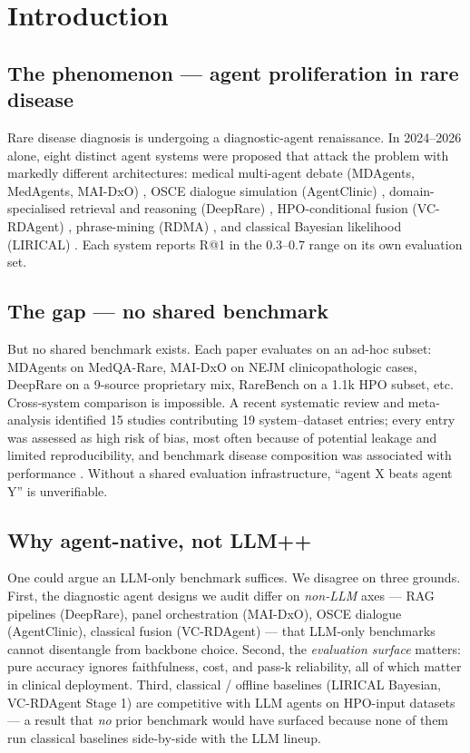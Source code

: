 \section{Introduction}\label{sec-2}

\subsection{The phenomenon --- agent proliferation in rare disease}\label{sec-2-1}

Rare disease diagnosis is undergoing a diagnostic-agent renaissance.
In 2024--2026 alone, eight distinct agent systems were proposed that
attack the problem with markedly different architectures: medical
multi-agent debate (MDAgents, MedAgents, MAI-DxO)
\citep{mdagents2024,medagents2024,maidxo2025}, OSCE dialogue simulation
(AgentClinic) \citep{agentclinic2024}, domain-specialised retrieval and
reasoning (DeepRare) \citep{deeprare2026}, HPO-conditional fusion
(VC-RDAgent) \citep{vcrdagent}, phrase-mining (RDMA) \citep{rdma2025},
and classical Bayesian likelihood (LIRICAL) \citep{lirical2020}.
Each system reports R@1 in the 0.3--0.7 range on its own evaluation set.

\subsection{The gap --- no shared benchmark}\label{sec-2-2}

But no shared benchmark exists. Each paper evaluates on an ad-hoc
subset: MDAgents on MedQA-Rare, MAI-DxO on NEJM clinicopathologic
cases, DeepRare on a 9-source proprietary mix, RareBench on a 1.1k HPO
subset, etc. Cross-system comparison is impossible. A recent
systematic review and meta-analysis identified 15 studies contributing 19
system--dataset entries; every entry was assessed as high risk of bias, most
often because of potential leakage and limited reproducibility, and benchmark
disease composition was associated with performance
\citep{sysreview2026}. Without a shared evaluation infrastructure, ``agent X
beats agent Y'' is unverifiable.

\subsection{Why agent-native, not LLM++}\label{sec-2-3}

One could argue an LLM-only benchmark suffices. We disagree on three
grounds. First, the diagnostic agent designs we audit differ on
\emph{non-LLM} axes --- RAG pipelines (DeepRare), panel orchestration
(MAI-DxO), OSCE dialogue (AgentClinic), classical fusion
(VC-RDAgent) --- that LLM-only benchmarks cannot disentangle from
backbone choice. Second, the \emph{evaluation surface} matters: pure
accuracy ignores faithfulness, cost, and pass-k reliability, all of
which matter in clinical deployment. Third, classical / offline baselines (LIRICAL Bayesian, VC-RDAgent Stage 1) are competitive
with LLM agents on HPO-input datasets --- a result that \emph{no} prior
benchmark would have surfaced because none of them run classical
baselines side-by-side with the LLM lineup.

